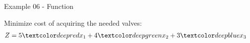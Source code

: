 \begin{frame}{Example 06 - Function}

Minimize  cost of acquiring the needed valves:
\begin{align*}
    Z &= 5\colora{x_1} + 4\colorb{x_2} + 3\colorc{x_3}
\end{align*}

\end{frame}
